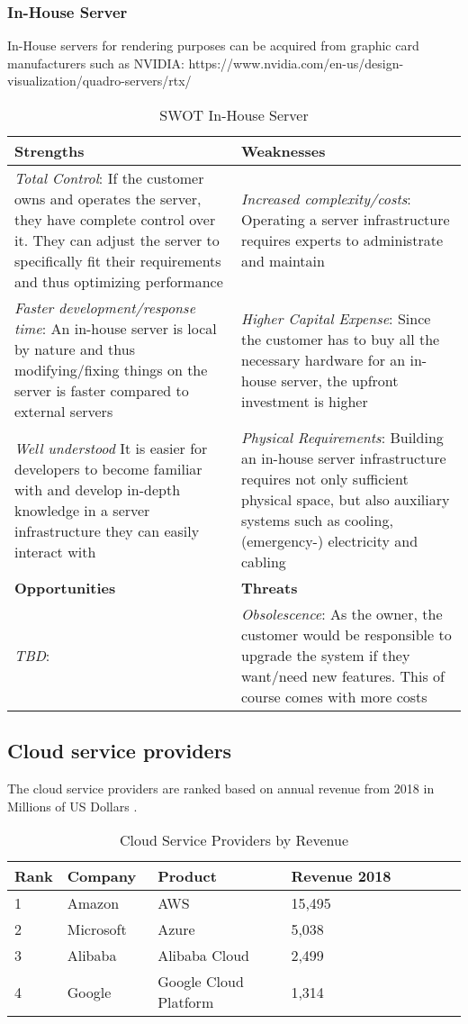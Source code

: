 \subsubsection{In-House Server}
In-House servers for rendering purposes can be acquired from graphic card manufacturers such as NVIDIA: https://www.nvidia.com/en-us/design-visualization/quadro-servers/rtx/

\begin{longtable}{ | p{0.5\linewidth} | p{0.5\linewidth} | } 
\caption{SWOT In-House Server} \\
 \hline
 \textbf{Strengths} & \textbf{Weaknesses}\\ 
\hline
 \textit{Total Control}: If the customer owns and operates the server, they have complete control over it. They can adjust the server to specifically fit their requirements and thus optimizing performance & \textit{Increased complexity/costs}: Operating a server infrastructure requires experts to administrate and maintain \\ 
\textit{Faster development/response time}: An in-house server is local by nature and thus modifying/fixing things on the server is faster compared to external servers & \textit{Higher Capital Expense}: Since the customer has to buy all the necessary hardware for an in-house server, the upfront investment is higher \\
\textit{Well understood} It is easier for developers to become familiar with and develop in-depth knowledge in a server infrastructure they can easily interact with & \textit{Physical Requirements}: Building an in-house server infrastructure requires not only sufficient physical space, but also auxiliary systems such as cooling, (emergency-) electricity and cabling \\
 \hline
 \textbf{Opportunities} & \textbf{Threats}  \\ 
 \hline
\textit{TBD}: & \textit{Obsolescence}: As the owner, the customer would be responsible to upgrade the system if they want/need new features. This of course comes with more costs \\
\hline 
\end{longtable}

\subsection{Cloud service providers}
The cloud service providers are ranked based on annual revenue from 2018 in Millions of US Dollars \parencite{iaasrevenue}.
\begin{longtable}{ | p{0.1\linewidth} | p{0.2\linewidth} | p{0.3\linewidth} | p{0.4\linewidth} |} 
\caption{Cloud Service Providers by Revenue} \\
\hline
\textbf{Rank} & \textbf{Company} & \textbf{Product} & \textbf{Revenue 2018} \\ 
\hline
1 & Amazon & AWS & 15,495\\
\hline
2 & Microsoft & Azure & 5,038 \\
\hline
3 & Alibaba & Alibaba Cloud & 2,499 \\
\hline
4 & Google & Google Cloud Platform & 1,314\\
\hline
\end{longtable}